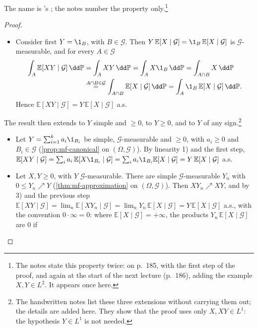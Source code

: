 The name is \citeauthor{williams}'s \citep[Section~9.7]{williams}; the notes number the
property only.\footnote{The notes state this property twice: on p.~185, with the first step of the
proof, and again at the start of the next lecture (p.~186), adding the example $X,Y\in L^2$. It
appears once here.}

\begin{proof}
\begin{itemize}
  \item Consider first $Y=\1_B$, with $B\in\mathcal G$. Then $Y\,\mathbb E[X\mid\mathcal G]=\1_B\,\mathbb E[X\mid\mathcal G]$
    is $\mathcal G$-measurable, and for every $A\in\mathcal G$
    \[
    \begin{aligned}
      \int_A\mathbb E[XY\mid\mathcal G]\,\dd\mathbb P&=\int_AXY\,\dd\mathbb P=\int_AX\1_B\,\dd\mathbb P
      =\int_{A\cap B}X\,\dd\mathbb P\\
      &\overset{A\cap B\in\mathcal G}{=}\int_{A\cap B}\mathbb E[X\mid\mathcal G]\,\dd\mathbb P
      =\int_A\1_B\,\mathbb E[X\mid\mathcal G]\,\dd\mathbb P .
    \end{aligned}
    \]
    Hence $\mathbb E[XY\mid\mathcal G]=Y\,\mathbb E[X\mid\mathcal G]$ a.s.
\end{itemize}
The result then extends to $Y$ simple and $\ge0$, to $Y\ge0$, and to $Y$ of any
sign.\footnote{The handwritten notes list these three extensions without carrying them out; the
details are added here. They show that the proof uses only $X,XY\in L^1$: the hypothesis
$Y\in L^1$ is not needed.}
\begin{itemize}
  \item Let $Y=\sum_{i=1}^ka_i\1_{B_i}$ be simple, $\mathcal G$-measurable and $\ge0$, with $a_i\ge0$
    and $B_i\in\mathcal G$ (\cref{prop:mf-canonical} on $(\Omega,\mathcal G)$). By linearity 1) and
    the first step,
    $\mathbb E[XY\mid\mathcal G]=\sum_ia_i\,\mathbb E[X\1_{B_i}\mid\mathcal G]=\sum_ia_i\1_{B_i}\mathbb E[X\mid\mathcal G]
    =Y\,\mathbb E[X\mid\mathcal G]$ a.s.
  \item Let $X,Y\ge0$, with $Y$ $\mathcal G$-measurable. There are simple $\mathcal G$-measurable
    $Y_n$ with $0\le Y_n\nearrow Y$ (\cref{thm:mf-approximation} on $(\Omega,\mathcal G)$). Then
    $XY_n\nearrow XY$, and by 3) and the previous step
    $\mathbb E[XY\mid\mathcal G]=\lim_n\mathbb E[XY_n\mid\mathcal G]=\lim_nY_n\,\mathbb E[X\mid\mathcal G]
    =Y\,\mathbb E[X\mid\mathcal G]$ a.s., with the convention $0\cdot\infty=0$: where
    $\mathbb E[X\mid\mathcal G]=+\infty$, the products $Y_n\,\mathbb E[X\mid\mathcal G]$ are $0$ if

\end{itemize}
\end{proof}
